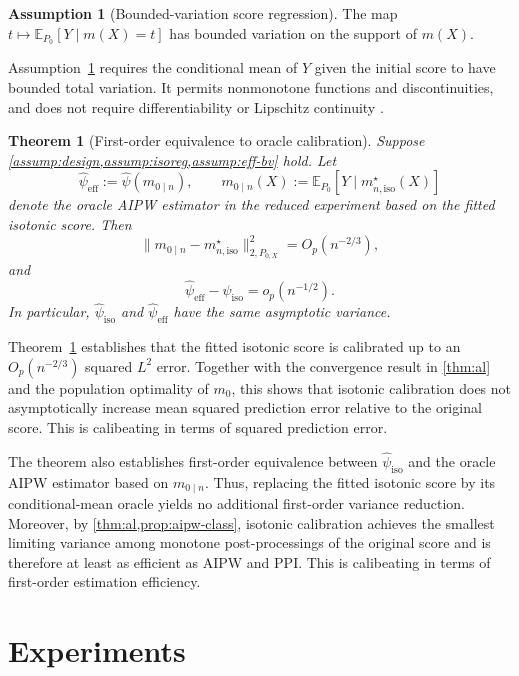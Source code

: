 \documentclass{article}
\theoremstyle{plain}
\newtheorem{theorem}{Theorem}
\theoremstyle{definition}
\newtheorem{assumption}{Assumption}
\newcommand{\E}{\mathbb{E}}
\newcommand{\1}{\mathbbm{1}}
\newcommand{\mhat}{m}
\newcommand{\Px}{P_{0,X}}
\begin{document}
\begin{assumption}[Bounded-variation score regression]
\label{assump:eff-bv}
The map $t\mapsto \E_{P_0}[Y\mid \mhat(X)=t]$
has bounded variation on the support of $\mhat(X)$.
\end{assumption}

Assumption~\ref{assump:eff-bv} requires the conditional mean
of $Y$ given the initial score to have bounded total variation.
It permits nonmonotone functions and discontinuities, and does not require differentiability
or Lipschitz continuity \citep{van2023causal}.

\begin{theorem}[First-order equivalence to oracle calibration]
\label{prop:eif-red}
Suppose \cref{assump:design,assump:isoreg,assump:eff-bv} hold. Let
\[
\widehat{\psi}_{\mathrm{eff}}
:=
\widehat{\psi}(m_{0\mid n}),
\qquad
m_{0\mid n}(X)
:=
\E_{P_0}[Y \mid m_{n,\mathrm{iso}}^\star(X)]
\]
denote the oracle AIPW estimator in the reduced experiment
based on the fitted isotonic score. Then
\[
\|m_{0\mid n}-m_{n,\mathrm{iso}}^\star\|_{2,\Px}^2
=
O_p(n^{-2/3}),
\]
and
\[
\widehat{\psi}_{\mathrm{eff}}
-
\widehat{\psi}_{\mathrm{iso}}
=
o_p(n^{-1/2}).
\]
In particular, $\widehat{\psi}_{\mathrm{iso}}$ and
$\widehat{\psi}_{\mathrm{eff}}$ have the same asymptotic variance.
\end{theorem}

Theorem~\ref{prop:eif-red} establishes that the fitted isotonic
score is calibrated up to an $O_p(n^{-2/3})$ squared $L^2$
error. Together with the convergence result in
\cref{thm:al} and the population optimality of $m_0$,
this shows that isotonic calibration does not asymptotically
increase mean squared prediction error relative to the
original score. This is calibeating in terms of squared prediction error.

The theorem also establishes first-order equivalence between
$\widehat{\psi}_{\mathrm{iso}}$ and the oracle AIPW estimator
based on $m_{0\mid n}$. Thus, replacing the fitted isotonic score by its
conditional-mean oracle yields no additional first-order
variance reduction. Moreover, by \cref{thm:al,prop:aipw-class},
isotonic calibration achieves the smallest limiting variance
among monotone post-processings of the original score and
is therefore at least as efficient as AIPW and PPI.
This is calibeating in terms of first-order estimation efficiency.

\section{Experiments}
\label{sec:exp}
\end{document}
